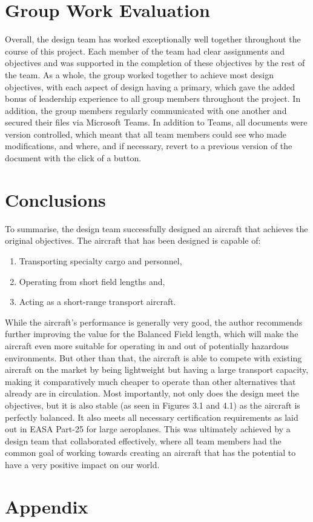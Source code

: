\documentclass[stu, a4paper, 12pt, floatsintext]{apa7}
\numberwithin{figure}{section}
\numberwithin{table}{section}
\numberwithin{equation}{section}
\begin{document}
\section{Group Work Evaluation}
Overall, the design team has worked exceptionally well together throughout the course of this project. Each member of the team had clear assignments and objectives and was supported in the completion of these objectives by the rest of the team. As a whole, the group worked together to achieve most design objectives, with each aspect of design having a primary, which gave the added bonus of leadership experience to all group members throughout the project. In addition, the group members regularly communicated with one another and secured their files via Microsoft Teams. In addition to Teams, all documents were version controlled, which meant that all team members could see who made modifications, and where, and if necessary, revert to a previous version of the document with the click of a button.  
\section{Conclusions}
To summarise, the design team successfully designed an aircraft that achieves the original objectives. The aircraft that has been designed is capable of:
\begin{enumerate}
    \item Transporting specialty cargo and personnel, 
    \item Operating from short field lengths and,
    \item Acting as a short-range transport aircraft.
\end{enumerate}
While the aircraft's performance is generally very good, the author recommends further improving the value for the Balanced Field length, which will make the aircraft even more suitable for operating in and out of potentially hazardous environments. But other than that, the aircraft is able to compete with existing aircraft on the market by being lightweight but having a large transport capacity, making it comparatively much cheaper to operate than other alternatives that already are in circulation. Most importantly, not only does the design meet the objectives, but it is also stable (as seen in Figures 3.1 and 4.1) as the aircraft is perfectly balanced. It also meets all necessary certification requirements as laid out in EASA Part-25 for large aeroplanes. 
This was ultimately achieved by a design team that collaborated effectively, where all team members had the common goal of working towards creating an aircraft that has the potential to have a very positive impact on our world.
\section{Appendix}

\printbibliography
\end{document}
